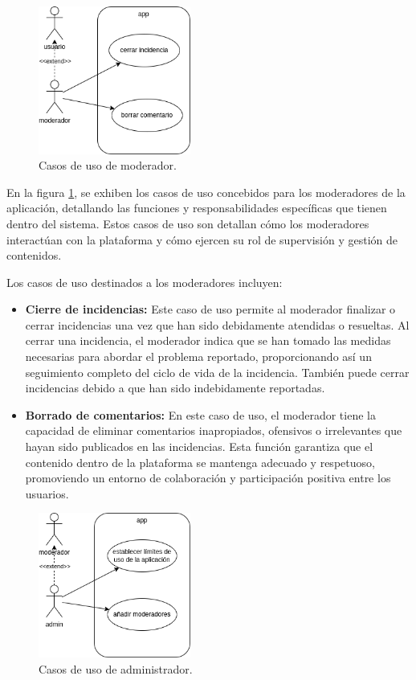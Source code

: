 \documentclass{article}
\begin{document}
\begin{figure}[H]
    \center
    \includegraphics[width=5cm]{images/caso_de_uso_moderador.png}
    \caption{Casos de uso de moderador.}
    \label{fig:caso_uso_mod}
\end{figure}

En la figura \ref{fig:caso_uso_mod}, se exhiben los casos de uso concebidos para los moderadores de la aplicación, detallando las funciones y responsabilidades específicas que tienen dentro del sistema. Estos casos de uso son detallan cómo los moderadores interactúan con la plataforma y cómo ejercen su rol de supervisión y gestión de contenidos.

Los casos de uso destinados a los moderadores incluyen:

\begin{itemize}
    \item \textbf{Cierre de incidencias:} Este caso de uso permite al moderador finalizar o cerrar incidencias una vez que han sido debidamente atendidas o resueltas. Al cerrar una incidencia, el moderador indica que se han tomado las medidas necesarias para abordar el problema reportado, proporcionando así un seguimiento completo del ciclo de vida de la incidencia. También puede cerrar incidencias debido a que han sido indebidamente reportadas.
    
    \item \textbf{Borrado de comentarios:} En este caso de uso, el moderador tiene la capacidad de eliminar comentarios inapropiados, ofensivos o irrelevantes que hayan sido publicados en las incidencias. Esta función garantiza que el contenido dentro de la plataforma se mantenga adecuado y respetuoso, promoviendo un entorno de colaboración y participación positiva entre los usuarios.
\end{itemize}

\begin{figure}[H]
    \center
    \includegraphics[width=5cm]{images/caso_de_uso_admin.png}
    \caption{Casos de uso de administrador.}
    \label{fig:caso_uso_admin}
\end{figure}
\end{document}
